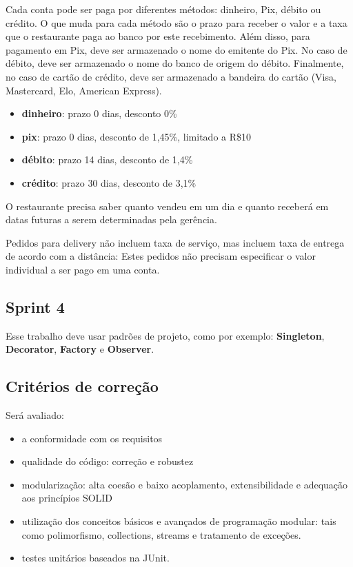 \documentclass[11pt,brazil, a4paper, fullpage]{article}
\begin{document}
Cada conta pode ser paga por diferentes métodos: dinheiro, Pix, débito ou crédito. O que muda para cada método são o prazo para receber o valor e a taxa que o restaurante paga ao banco por este recebimento. Além disso, para pagamento em Pix, deve ser armazenado o nome do emitente do Pix. No caso de débito, deve ser armazenado o nome do banco de origem do débito. Finalmente, no caso de cartão de crédito, deve ser armazenado a bandeira do cartão (Visa, Mastercard, Elo, American Express).

\begin{itemize}
    \item \textbf{dinheiro}: prazo 0 dias, desconto 0\%
    \item \textbf{pix}: prazo 0 dias, desconto de 1,45\%, limitado a R\$10
    \item \textbf{débito}: prazo 14 dias, desconto de 1,4\%
    \item \textbf{crédito}: prazo 30 dias, desconto de 3,1\%
\end{itemize}

O restaurante precisa saber quanto vendeu em um dia e quanto receberá em datas futuras a serem determinadas pela gerência.

Pedidos para delivery não incluem taxa de serviço, mas incluem taxa de entrega de acordo com a distância: Estes pedidos não precisam especificar o valor individual a ser pago em uma conta.


\subsection{Sprint 4}


\begin{center}
    \setlength{\fboxsep}{10pt}
\end{center}

Esse trabalho deve usar padrões de projeto, como por exemplo: \textbf{Singleton}, \textbf{Decorator}, \textbf{Factory} e \textbf{Observer}.


\subsection{Critérios de correção}

Será avaliado:
\begin{itemize}
    \item a conformidade com os requisitos
    \item qualidade do código: correção e robustez
    \item modularização: alta coesão e baixo acoplamento, extensibilidade e adequação aos princípios SOLID
    \item utilização dos conceitos básicos e avançados de programação modular: tais como polimorfismo, collections, streams e tratamento de exceções.
    \item testes unitários baseados na JUnit.
\end{itemize}
\end{document}
